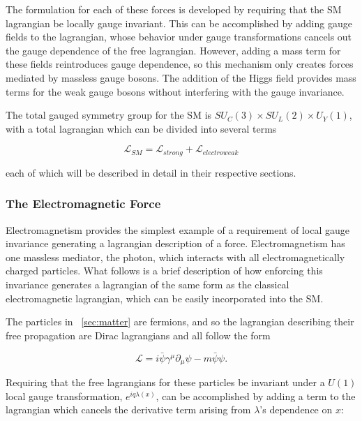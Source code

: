 The formulation for each of these forces is developed by requiring that the \ac{SM} lagrangian be locally gauge invariant. \cite{Griffiths:111880} This can be accomplished by adding gauge fields to the lagrangian, whose behavior under gauge transformations cancels out the gauge dependence of the free lagrangian. However, adding a mass term for these fields reintroduces gauge dependence, so this mechanism only creates forces mediated by massless gauge bosons. The addition of the Higgs field provides mass terms for the weak gauge bosons without interfering with the gauge invariance. 

The total gauged symmetry group for the \ac{SM} is $SU_C(3) \times SU_L(2) \times U_Y(1)$, with a total lagrangian which can be divided into several terms

\begin{equation}
\mathcal{L}_{SM} = \mathcal{L}_{strong} + \mathcal{L}_{electroweak}
\end{equation}

each of which will be described in detail in their respective sections. 

\subsubsection{The Electromagnetic Force}
\label{sec:em}

Electromagnetism provides the simplest example of a requirement of local gauge invariance generating a lagrangian description of a force.
Electromagnetism has one massless mediator, the photon, which interacts with all electromagnetically charged particles. What follows is a brief description of how enforcing this invariance generates a lagrangian of the same form as the classical electromagnetic lagrangian, which can be easily incorporated into the \ac{SM}. 

The particles in ~\autoref{sec:matter} are fermions, and so the lagrangian describing their free propagation are Dirac lagrangians and all follow the form

\begin{equation}
\mathcal{L} = i\bar{\psi}\gamma^\mu \partial_\mu\psi - m \bar{\psi}\psi . 
\end{equation}

Requiring that the free lagrangians for these particles be invariant under a $U(1)$ local gauge transformation, $e^{iq\lambda(x)}$, can be accomplished by adding a term to the lagrangian which cancels the derivative term arising from $\lambda$'s dependence on $x$: 

